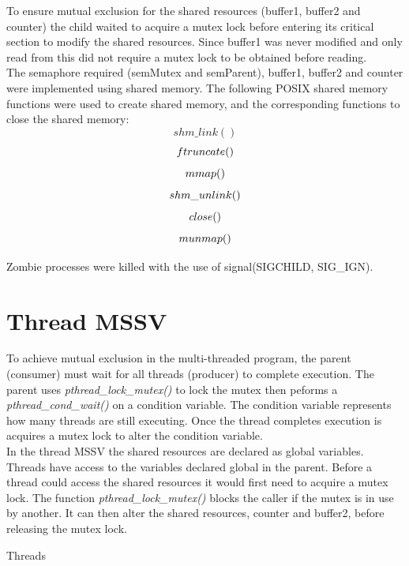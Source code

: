 \documentclass[]{article}
\begin{document}
To ensure mutual exclusion for the shared resources (buffer1, buffer2 and counter) the child waited to acquire a mutex lock before entering its critical section to modify the shared resources. Since buffer1 was never modified and only read from this did not require a mutex lock to be obtained before reading. \\

The semaphore required (semMutex and semParent), buffer1, buffer2 and counter were implemented using shared memory. The following POSIX shared memory functions were used to create shared memory, and the corresponding functions to close the shared memory: \\
$$
shm\_link()
$$
$$
ftruncate()\\
$$
$$
mmap()\\ 
$$
$$
shm\_unlink() \\
$$
$$
close()\\
$$
$$
munmap()\\ 
$$
	
	
Zombie processes were killed with the use of signal(SIGCHILD, SIG\_IGN).




\section{Thread MSSV}
To achieve mutual exclusion in the multi-threaded program, the parent (consumer) must wait for all threads (producer) to complete execution. The parent uses \textit{pthread\_lock\_mutex()} to lock the mutex then peforms a \textit{pthread\_cond\_wait()} on a condition variable. The condition variable represents how many threads are still executing. Once the thread completes execution is acquires a mutex lock to alter the condition variable. \\


In the thread MSSV the shared resources are declared as global variables. Threads have access to the variables declared global in the parent. Before a thread could access the shared resources it would first need to acquire a mutex lock. The function \textit{pthread\_lock\_mutex()} blocks the caller if the mutex is in use by another. It can then alter the shared resources, counter and buffer2, before releasing the mutex lock.

Threads

\pagebreak
\end{document}
